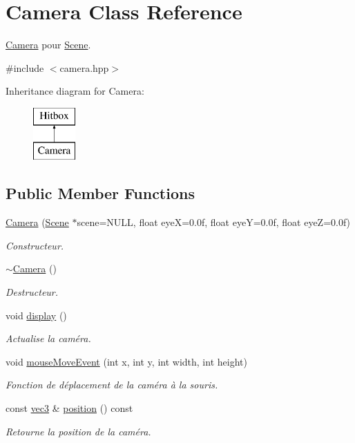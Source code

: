 \hypertarget{class_camera}{\section{Camera Class Reference}
\label{class_camera}
}


\hyperlink{class_camera}{Camera} pour \hyperlink{class_scene}{Scene}.  




{\ttfamily \#include $<$camera.\+hpp$>$}

Inheritance diagram for Camera\+:\begin{figure}[H]
\begin{center}
\leavevmode
\includegraphics[height=2.000000cm]{class_camera}
\end{center}
\end{figure}
\subsection*{Public Member Functions}
\begin{DoxyCompactItemize}
\item 
\hyperlink{class_camera_a1a8ac754efe577c8abbc1e19cc8bca25}{Camera} (\hyperlink{class_scene}{Scene} $\ast$scene=N\+U\+L\+L, float eye\+X=0.\+0f, float eye\+Y=0.\+0f, float eye\+Z=0.\+0f)
\begin{DoxyCompactList}\small\item\em Constructeur. \end{DoxyCompactList}\item 
\hyperlink{class_camera_ad1897942d0ccf91052386388a497349f}{$\sim$\+Camera} ()
\begin{DoxyCompactList}\small\item\em Destructeur. \end{DoxyCompactList}\item 
void \hyperlink{class_camera_adbfdac30f082ddea86183c1c31493946}{display} ()
\begin{DoxyCompactList}\small\item\em Actualise la caméra. \end{DoxyCompactList}\item 
void \hyperlink{class_camera_a22aaf20b581d402e5c3952655b830c0f}{mouse\+Move\+Event} (int x, int y, int width, int height)
\begin{DoxyCompactList}\small\item\em Fonction de déplacement de la caméra à la souris. \end{DoxyCompactList}\item 
const \hyperlink{structvec3}{vec3} \& \hyperlink{class_camera_ad42b0114b12a48474ae6c8be1c44e7bb}{position} () const 
\begin{DoxyCompactList}\small\item\em Retourne la position de la caméra. \end{DoxyCompactList}\end{DoxyCompactItemize}
